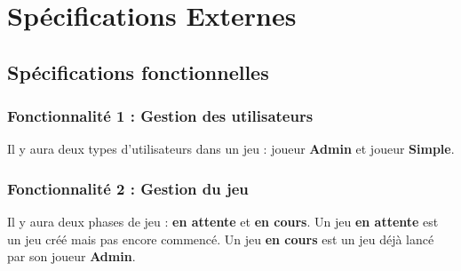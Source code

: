 \section{Spécifications Externes}
%
%
\subsection{Spécifications fonctionnelles}
\subsubsection{Fonctionnalité 1 : Gestion des utilisateurs}
Il y aura deux types d'utilisateurs dans un jeu : joueur \textbf{Admin} et joueur \textbf{Simple}. 
\subsubsection{Fonctionnalité 2 : Gestion du jeu}
Il y aura deux phases de jeu : \textbf{en attente} et \textbf{en cours}. Un jeu \textbf{en attente} est un jeu créé mais pas encore commencé. Un jeu \textbf{en cours} est un jeu déjà lancé par son joueur \textbf{Admin}. 
